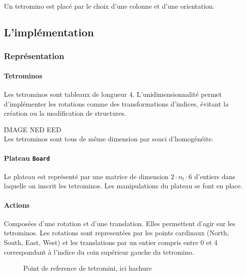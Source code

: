 \documentclass{article}
\begin{document}
Un tetromino est plac\'e par le choix d'une colonne et d'une orientation.

\subsection{L'impl\'ementation}

\subsubsection{Représentation}

\paragraph{Tetrominos}
Les tetrominos sont tableaux de longueur 4. L'unidimensionnalit\'e permet
d'impl\'ementer les rotations comme des transformations d'indices, \'evitant la
cr\'eation ou la modification de structures.

IMAGE NED EED\\
Les tetrominos sont tous de même dimension par souci d'homogénéite.

\paragraph{Plateau \texttt{Board}}
Le plateau est repr\'esent\'e par une matrice de dimension
\(2\cdot n_t\cdot 6\) d'entiers dans laquelle on inscrit les tetrominos. Les
manipulations du plateau se font en place.


\paragraph{Actions}
Composées d'une rotation et d'une translation. Elles permettent d'agir sur les
tetrominos. Les rotations sont representées par les points cardinaux
(North, South, East, West) et les translations par un entier compris entre 0 et
4 correspondant à l'indice du coin supérieur gauche du tetromino.
\begin{figure}
  \centering
  \qquad
  \caption{Point de reference de tetromini, ici hachure}\label{fig:tetref}
\end{figure}
\end{document}
